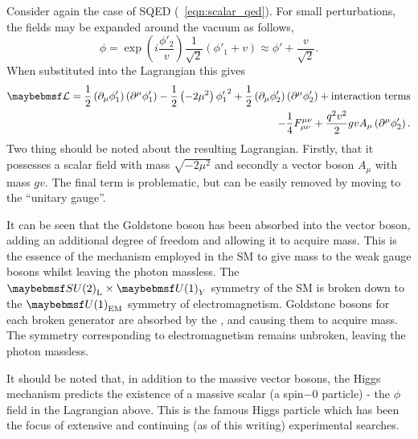 Consider again the case of \ac{SQED} (\eqn~\ref{eqn:scalar_qed}). For small
perturbations, the fields may be expanded around the vacuum as follows,
\begin{equation*}
\phi = \exp\left(i\frac{\phi'_2}{v}\right)\frac{1}{\sqrt{2}}\left(\phi'_1 + v\right) \approx
\phi' + \frac{v}{\sqrt{2}}.
\end{equation*}
When substituted into the Lagrangian this gives
\begin{align*}
  \lagrangiand =
  \frac{1}{2}\left(\partial_{\mu}\phi'_1\right)\left(\partial^{\mu}\phi'_1\right)
  - \frac{1}{2}\left(-2\mu^2\right){\phi'_1}^2 +
  \frac{1}{2}\left(\partial_{\mu}\phi'_2\right)\left(\partial^{\mu}\phi'_2\right)
  + \textrm{interaction terms}\\
  - \frac{1}{4}F_{\mu\nu}^{\mu\nu} +
  \frac{q^2v^2}{2}gvA_{\mu}\left(\partial^{\mu}\phi'_2\right).
\end{align*}
Two thing should be noted about the resulting Lagrangian. Firstly, that it
possesses a scalar field with mass $\sqrt{-2\mu^2}$ and secondly a vector
boson $A_{\mu}$ with mass $gv$. The final term is problematic, but can be
easily removed by moving to the ``unitary gauge''.

It can be seen that the Goldstone boson has been absorbed into the vector boson,
adding an additional degree of freedom and allowing it to acquire mass. This is
the essence of the mechanism employed in the \ac{SM} to give mass to the weak
gauge bosons whilst leaving the photon massless. The
$\SUtwo_{\textrm{L}}\times\Uone_{Y}$ symmetry of the \ac{SM} is broken down to
the $\Uone_{\textrm{EM}}$ symmetry of electromagnetism. Goldstone bosons for
each broken generator are absorbed by the \PWp, \PWm and \PZ causing them to
acquire mass. The symmetry corresponding to electromagnetism remains unbroken,
leaving the photon massless.

It should be noted that, in addition to the massive vector bosons, the Higgs
mechanism predicts the existence of a massive scalar (a spin$-0$ particle) - the
$\phi$ field in the Lagrangian above. This is the famous Higgs particle which
has been the focus of extensive and continuing (as of this writing) experimental
searches.

